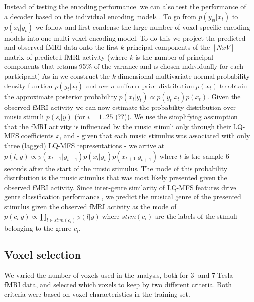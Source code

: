 Instead of testing the encoding performance, we can also test the performance of
a decoder based on the individual encoding models \citet{NG11}. To go from
$p(y_{vt}|x_{t})$ to $p(x_{t}|y_{t})$ we follow \citet{NG09} and first condense
the large number of voxel-specific encoding models into one multi-voxel encoding model.
To do this we project the predicted and observed f{MRI} data onto the first $k$ principal components of the $[N x V]$ matrix of predicted f{MRI} activity  (where $k$ is the number of principal components that retains 95\% of the variance and is chosen individually for each participant) 
As in \citet{NG09} we construct the $k$-dimensional multivariate normal
probability density function $p(y_{t}|x_{t})$ and use a uniform prior
distribution $p(x_{t})$ to obtain the approximate posterior probability
$p(x_{t}|y_{t}) \propto p(y_{t}|x_{t})p(x_{t})$. Given the observed f{MRI}
activity we can now estimate the probability distribution over music stimuli
$p(s_{i}|y)$ (for $i=1..25$ (??)). We use the simplifying assumption that the
f{MRI} activity is influenced by the music stimuli only through their LQ-MFS
coefficients $x$, and - given that each music stimulus was associated with only
three (lagged) LQ-MFS representations - we arrive at $p(l_{i}|y) \propto
p(x_{t-1}|y_{t-1})p(x_{t}|y_{t})p(x_{t+1}|y_{t+1})$ where $t$ is the sample 6
seconds after the start of the music stimulus. The mode of this probability
distribution is the music stimulus that was most likely presented given the
observed f{MRI} activity. Since inter-genre similarity of LQ-MFS features drive
genre classification performance \citep{CTK+2012}, we predict the musical genre
of the presented stimulus given the observed f{MRI} activity as the mode of $p(c_{i}|y)
\propto \prod\nolimits_{l \in stim(c_{i})} p(l|y)$ where $stim(c_{i})$ are
the labels of the stimuli belonging to the genre $c_{i}$. 

\subsection*{Voxel selection}

We varied the number of voxels used in the analysis, both for 3- and 7-Tesla f{MRI} data,
and selected which voxels to keep by two different criteria. Both criteria were
based on voxel characteristics in the training set.  

